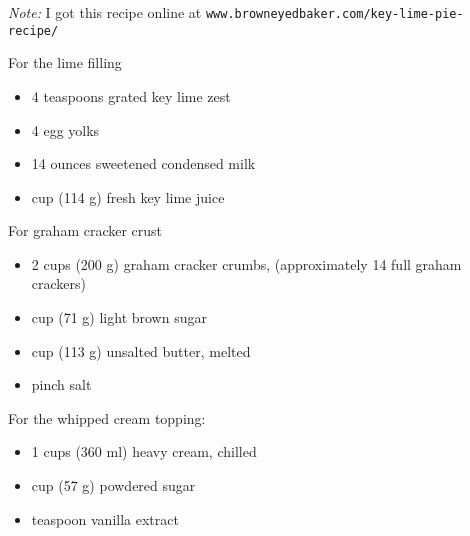 
\textit{Note:} I got this recipe online at \texttt{www.browneyedbaker.com/key-lime-pie-recipe/}
\ingredients

For the lime filling
\begin{itemize}
    \item 4 teaspoons grated key lime zest
    \item 4 egg yolks
    \item 14 ounces sweetened condensed milk
    \item {} cup (114 g) fresh key lime juice
\end{itemize}

For graham cracker crust
\begin{itemize}
    \item 2 cups (200 g) graham cracker crumbs, (approximately 14 full graham crackers)
    \item {} cup (71 g) light brown sugar
    \item {} cup (113 g) unsalted butter, melted
    \item pinch salt
\end{itemize}

For the whipped cream topping:
\begin{itemize}
    \item 1  cups (360 ml) heavy cream, chilled
    \item {} cup (57 g) powdered sugar
    \item {} teaspoon vanilla extract
\end{itemize}

